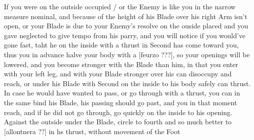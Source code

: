 If you were on the outside occupied / or the Enemy is like you in the
narrow measure nominal, and because of the height of his Blade over
his right Arm isn't open, or your Blade is due to your Enemy's resolve
on the ouside placed and you gave neglected to give tempo from his
parry, and you will notice if you would've gone fast, taht he on the
inside with a thrust in Second has come toward you, thus you in
advance halve your body with a [feurzo ???],
so your openings will be lowered, and you become stronger with the
Blade than him, in that you enter with your left leg,
and with your Blade stronger over his can disoccupy and reach, or
under his Blade with Second on the inside to his body safely can
thrust. In case he would have wanted to pass, or go through with a
thrust, you can in the same bind his Blade, his passing should go
past, and you in that moment reach, and if he did not go through, go
quickly on the inside to his opening.
Against the outside under the Blade, circle to fourth and so much
better to [allontnera ??] in hs thrust, without movement of the Foot
